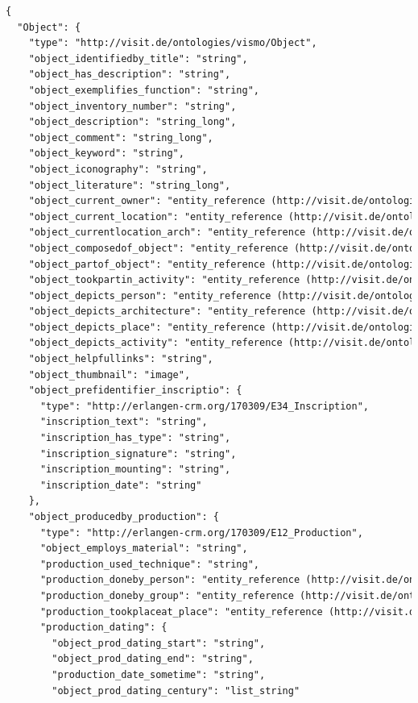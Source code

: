 \begin{lstlisting}[caption={JSON \q{Schema} der ViSIT Daten, die über die REST API ausgespielt werden.},label={lst:json},captionpos=b,language=xml]
	{
  "Object": {
    "type": "http://visit.de/ontologies/vismo/Object",
    "object_identifiedby_title": "string",
    "object_has_description": "string",
    "object_exemplifies_function": "string",
    "object_inventory_number": "string",
    "object_description": "string_long",
    "object_comment": "string_long",
    "object_keyword": "string",
    "object_iconography": "string",
    "object_literature": "string_long",
    "object_current_owner": "entity_reference (http://visit.de/ontologies/vismo/Institution)",
    "object_current_location": "entity_reference (http://visit.de/ontologies/vismo/Institution)",
    "object_currentlocation_arch": "entity_reference (http://visit.de/ontologies/vismo/Architecture)",
    "object_composedof_object": "entity_reference (http://visit.de/ontologies/vismo/Object)",
    "object_partof_object": "entity_reference (http://visit.de/ontologies/vismo/Object)",
    "object_tookpartin_activity": "entity_reference (http://visit.de/ontologies/vismo/Activity)",
    "object_depicts_person": "entity_reference (http://visit.de/ontologies/vismo/Person)",
    "object_depicts_architecture": "entity_reference (http://visit.de/ontologies/vismo/Architecture)",
    "object_depicts_place": "entity_reference (http://visit.de/ontologies/vismo/Place)",
    "object_depicts_activity": "entity_reference (http://visit.de/ontologies/vismo/Activity)",
    "object_helpfullinks": "string",
    "object_thumbnail": "image",
    "object_prefidentifier_inscriptio": {
      "type": "http://erlangen-crm.org/170309/E34_Inscription",
      "inscription_text": "string",
      "inscription_has_type": "string",
      "inscription_signature": "string",
      "inscription_mounting": "string",
      "inscription_date": "string"
    },
    "object_producedby_production": {
      "type": "http://erlangen-crm.org/170309/E12_Production",
      "object_employs_material": "string",
      "production_used_technique": "string",
      "production_doneby_person": "entity_reference (http://visit.de/ontologies/vismo/Person)",
      "production_doneby_group": "entity_reference (http://visit.de/ontologies/vismo/Group)",
      "production_tookplaceat_place": "entity_reference (http://visit.de/ontologies/vismo/Place)",
      "production_dating": {
        "object_prod_dating_start": "string",
        "object_prod_dating_end": "string",
        "production_date_sometime": "string",
        "object_prod_dating_century": "list_string"

\end{lstlisting}

